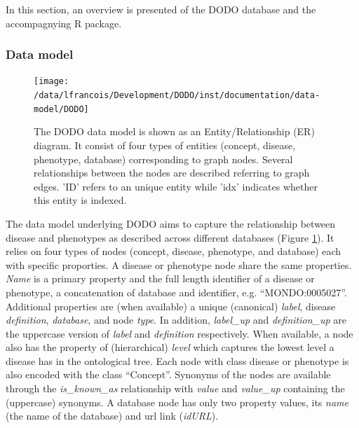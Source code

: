 \documentclass[9pt,a4paper,]{extarticle}
\begin{document}
In this section, an overview is presented of the DODO database and the accompagnying R package.

\hypertarget{data-model}{%
\subsubsection{Data model}\label{data-model}}

\begin{figure}

{\centering \texttt{[image: /data/lfrancois/Development/DODO/inst/documentation/data-model/DODO]} 

}

\caption{The DODO data model is shown as an Entity/Relationship (ER) diagram. It consist of four types of entities (concept, disease, phenotype, database) corresponding to graph nodes. Several relationships between the nodes are described referring to graph edges. 'ID' refers to an unique entity while 'idx' indicates whether this entity is indexed.}\label{fig:dataModel}
\end{figure}

The data model underlying DODO aims to capture the relationship between disease and phenotypes as described across different databases (Figure \ref{fig:dataModel}). It relies on four types of nodes (concept, disease, phenotype, and database) each with specific proporties. A disease or phenotype node share the same properties. \emph{Name} is a primary property and the full length identifier of a disease or phenotype, a concatenation of database and identifier, e.g. ``MONDO:0005027''. Additional properties are (when available) a unique (canonical) \emph{label}, disease \emph{definition}, \emph{database}, and node \emph{type}. In addition, \emph{label\_up} and \emph{definition\_up} are the uppercase version of \emph{label} and \emph{definition} respectively. When available, a node also has the property of (hierarchical) \emph{level} which captures the lowest level a disease has in the ontological tree. Each node with class disease or phenotype is also encoded with the class ``Concept''. Synonyms of the nodes are available through the \emph{is\_known\_as} relationship with \emph{value} and \emph{value\_up} containing the (uppercase) synonyms. A database node has only two property values, its \emph{name} (the name of the database) and url link (\emph{idURL}).
\end{document}
